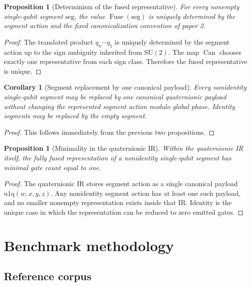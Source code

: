 \documentclass[11pt]{article}
\newtheorem{proposition}[definition]{Proposition}
\newtheorem{corollary}[definition]{Corollary}
\theoremstyle{remark}
\newcommand{\SU}{\mathrm{SU}}
\newcommand{\uoneq}{\mathrm{u1q}}
\newcommand{\canon}{\operatorname{Can}}
\newcommand{\Fuse}{\operatorname{Fuse}}
\begin{document}
\begin{proposition}[Determinism of the fused representative]
For every nonempty single-qubit segment $\mathrm{seg}$, the value
$\Fuse(\mathrm{seg})$ is uniquely determined by the segment action and the fixed
canonicalization convention of paper 2.
\end{proposition}

\begin{proof}
The translated product $q_n\cdots q_1$ is uniquely determined by the segment
action up to the sign ambiguity inherited from $\SU(2)$. The map $\canon$
chooses exactly one representative from each sign class. Therefore the fused
representative is unique.
\end{proof}

\begin{corollary}[Segment replacement by one canonical payload]
Every nonidentity single-qubit segment may be replaced by one canonical
quaternionic payload without changing the represented segment action modulo
global phase. Identity segments may be replaced by the empty segment.
\end{corollary}

\begin{proof}
This follows immediately from the previous two propositions.
\end{proof}

\begin{proposition}[Minimality in the quaternionic IR]
Within the quaternionic IR itself, the fully fused representation of a nonidentity
single-qubit segment has minimal gate count equal to one.
\end{proposition}

\begin{proof}
The quaternionic IR stores segment action as a single canonical payload
$\uoneq(w,x,y,z)$. Any nonidentity segment action has at least one such payload,
and no smaller nonempty representation exists inside that IR. Identity is the
unique case in which the representation can be reduced to zero emitted gates.
\end{proof}

\section{Benchmark methodology}

\subsection{Reference corpus}
\end{document}
